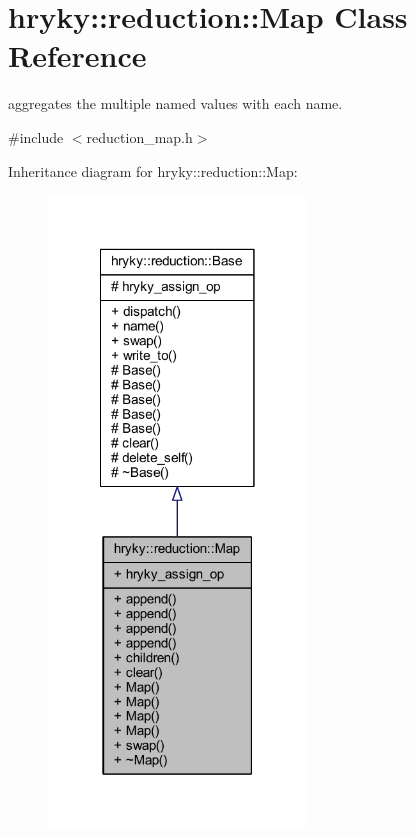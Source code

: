 \hypertarget{classhryky_1_1reduction_1_1_map}{\section{hryky\-:\-:reduction\-:\-:Map Class Reference}
\label{classhryky_1_1reduction_1_1_map}
}


aggregates the multiple named values with each name.  




{\ttfamily \#include $<$reduction\-\_\-map.\-h$>$}



Inheritance diagram for hryky\-:\-:reduction\-:\-:Map\-:
\nopagebreak
\begin{figure}[H]
\begin{center}
\leavevmode
\includegraphics[width=194pt]{classhryky_1_1reduction_1_1_map__inherit__graph}
\end{center}
\end{figure}
